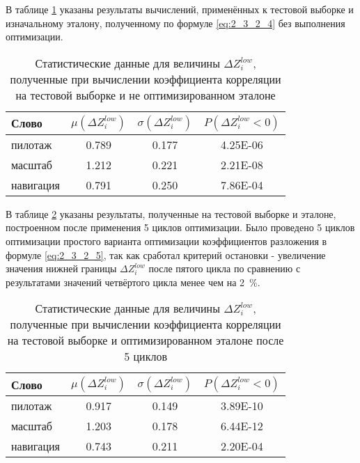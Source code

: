 В таблице \ref{tab:deltaZNoOptimization} указаны результаты вычислений, применённых к тестовой выборке и изначальному эталону, полученному по формуле \eqref{eq:2_3_2_4} без выполнения оптимизации.

\begin{table}[h]
	\centering
	\caption{Статистические данные для величины $\Delta Z^{low}_{i}$, полученные при вычислении коэффициента корреляции на тестовой выборке и не оптимизированном эталоне}
	\label{tab:deltaZNoOptimization}
	\begin{tabular}{| l | c | c | c |}
		\hline
		Слово \phantom{0000000} & \phantom{000} $\mu(\Delta Z^{low}_{i})$ \phantom{000} & \phantom{000} $\sigma(\Delta Z^{low}_{i})$ \phantom{000} & \phantom{000} $P(\Delta Z^{low}_{i} < 0)$ \phantom{000} \\
		\hline
		пилотаж		& 0.789	& 0.177 & 4.25E-06 \\
		масштаб		& 1.212	& 0.221 & 2.21E-08 \\
		навигация	& 0.791	& 0.250 & 7.86E-04 \\
		\hline
	\end{tabular}
\end{table}

В таблице \ref{tab:deltaZOptimization} указаны результаты, полученные на тестовой выборке и эталоне, построенном после применения 5 циклов оптимизации.
Было проведено 5 циклов оптимизации простого варианта оптимизации коэффициентов разложения в формуле \eqref{eq:2_3_2_5}, так как сработал критерий остановки - увеличение значения нижней границы $\Delta Z^{low}_{i}$ после пятого цикла по сравнению с результатами значений четвёртого цикла менее чем на 2~\%.

\begin{table}[h]
	\centering
	\caption{Статистические данные для величины $\Delta Z^{low}_{i}$, полученные при вычислении коэффициента корреляции на тестовой выборке и оптимизированном эталоне после 5 циклов}
	\label{tab:deltaZOptimization}
	\begin{tabular}{| l | c | c | c |}
		\hline
		Слово \phantom{0000000} & \phantom{000} $\mu(\Delta Z^{low}_{i})$ \phantom{000} & \phantom{000} $\sigma(\Delta Z^{low}_{i})$ \phantom{000} & \phantom{000} $P(\Delta Z^{low}_{i} < 0)$ \phantom{000} \\
		\hline
		пилотаж		& 0.917	& 0.149	& 3.89E-10 \\
		масштаб		& 1.203	& 0.178	& 6.44E-12 \\
		навигация	& 0.743	& 0.211	& 2.20E-04 \\
		\hline
	\end{tabular}
\end{table}

